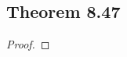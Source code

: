 \documentclass[../../main.tex]{subfiles}
\begin{document}
\subsection{Theorem 8.47}
\begin{wts}

\end{wts}
\begin{proof}

\end{proof}
\end{document}
